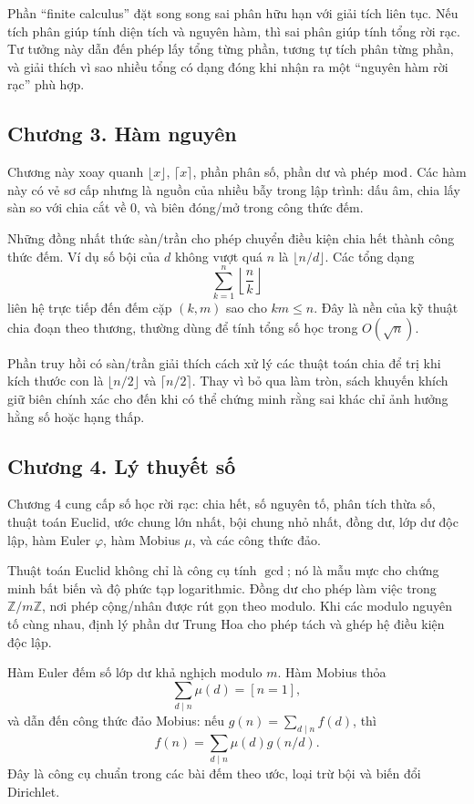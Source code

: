 \documentclass[11pt]{article}
\begin{document}
Phần ``finite calculus'' đặt song song sai phân hữu hạn với giải tích liên tục.
Nếu tích phân giúp tính diện tích và nguyên hàm, thì sai phân giúp tính tổng
rời rạc. Tư tưởng này dẫn đến phép lấy tổng từng phần, tương tự tích phân từng
phần, và giải thích vì sao nhiều tổng có dạng đóng khi nhận ra một ``nguyên
hàm rời rạc'' phù hợp.

\subsection*{Chương 3. Hàm nguyên}

Chương này xoay quanh \(\lfloor x\rfloor\), \(\lceil x\rceil\), phần phân số,
phần dư và phép \(\bmod\). Các hàm này có vẻ sơ cấp nhưng là nguồn của nhiều
bẫy trong lập trình: dấu âm, chia lấy sàn so với chia cắt về 0, và biên đóng/mở
trong công thức đếm.

Những đồng nhất thức sàn/trần cho phép chuyển điều kiện chia hết thành công
thức đếm. Ví dụ số bội của \(d\) không vượt quá \(n\) là
\(\lfloor n/d\rfloor\). Các tổng dạng
\[
  \sum_{k=1}^n \left\lfloor \frac{n}{k}\right\rfloor
\]
liên hệ trực tiếp đến đếm cặp \((k,m)\) sao cho \(km\le n\). Đây là nền của
kỹ thuật chia đoạn theo thương, thường dùng để tính tổng số học trong
\(O(\sqrt n)\).

Phần truy hồi có sàn/trần giải thích cách xử lý các thuật toán chia để trị khi
kích thước con là \(\lfloor n/2\rfloor\) và \(\lceil n/2\rceil\). Thay vì bỏ
qua làm tròn, sách khuyến khích giữ biên chính xác cho đến khi có thể chứng
minh rằng sai khác chỉ ảnh hưởng hằng số hoặc hạng thấp.

\subsection*{Chương 4. Lý thuyết số}

Chương 4 cung cấp số học rời rạc: chia hết, số nguyên tố, phân tích thừa số,
thuật toán Euclid, ước chung lớn nhất, bội chung nhỏ nhất, đồng dư, lớp dư độc
lập, hàm Euler \(\varphi\), hàm Mobius \(\mu\), và các công thức đảo.

Thuật toán Euclid không chỉ là công cụ tính \(\gcd\); nó là mẫu mực cho chứng
minh bất biến và độ phức tạp logarithmic. Đồng dư cho phép làm việc trong
\(\mathbb{Z}/m\mathbb{Z}\), nơi phép cộng/nhân được rút gọn theo modulo. Khi
các modulo nguyên tố cùng nhau, định lý phần dư Trung Hoa cho phép tách và
ghép hệ điều kiện độc lập.

Hàm Euler đếm số lớp dư khả nghịch modulo \(m\). Hàm Mobius thỏa
\[
  \sum_{d\mid n}\mu(d)=[n=1],
\]
và dẫn đến công thức đảo Mobius: nếu \(g(n)=\sum_{d\mid n} f(d)\), thì
\[
  f(n)=\sum_{d\mid n}\mu(d)g(n/d).
\]
Đây là công cụ chuẩn trong các bài đếm theo ước, loại trừ bội và biến đổi
Dirichlet.
\end{document}
